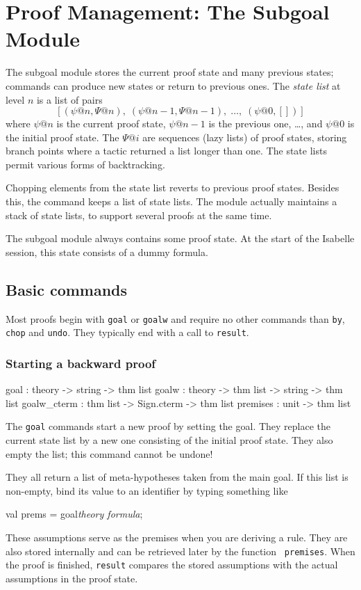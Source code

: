 \chapter{Proof Management: The Subgoal Module}

The subgoal module stores the current proof state and
many previous states; commands can produce new states or return to previous
ones.  The {\em state list\/} at level $n$ is a list of pairs
\[ [(\psi@n,\Psi@n),\; (\psi@{n-1},\Psi@{n-1}),\; \ldots,\; (\psi@0,[])] \]
where $\psi@n$ is the current proof state, $\psi@{n-1}$ is the previous
one, \ldots, and $\psi@0$ is the initial proof state.  The $\Psi@i$ are
sequences (lazy lists) of proof states, storing branch points where a
tactic returned a list longer than one.  The state lists permit various
forms of backtracking.

Chopping elements from the state list reverts to previous proof states.
Besides this, the  command keeps a list of state lists.  The
module actually maintains a stack of state lists, to support several
proofs at the same time.

The subgoal module always contains some proof state.  At the start of the
Isabelle session, this state consists of a dummy formula.


\section{Basic commands}
Most proofs begin with {\tt goal} or {\tt goalw} and require no other
commands than {\tt by}, {\tt chop} and {\tt undo}.  They typically end with
a call to {\tt result}.
\subsection{Starting a backward proof}
\begin{ttbox} 
goal        : theory -> string -> thm list 
goalw       : theory -> thm list -> string -> thm list 
goalw_cterm : thm list -> Sign.cterm -> thm list 
premises    : unit -> thm list
\end{ttbox}
The {\tt goal} commands start a new proof by setting the goal.  They
replace the current state list by a new one consisting of the initial proof
state.  They also empty the  list; this command cannot be
undone!

They all return a list of meta-hypotheses taken from the main goal.  If
this list is non-empty, bind its value to an \ML{} identifier by typing
something like
\begin{ttbox} 
val prems = goal{\it theory\/ formula};
\end{ttbox}
These assumptions serve as the premises when you are deriving a rule.  They
are also stored internally and can be retrieved later by the function {\tt
  premises}.  When the proof is finished, {\tt result} compares the
stored assumptions with the actual assumptions in the proof state.

